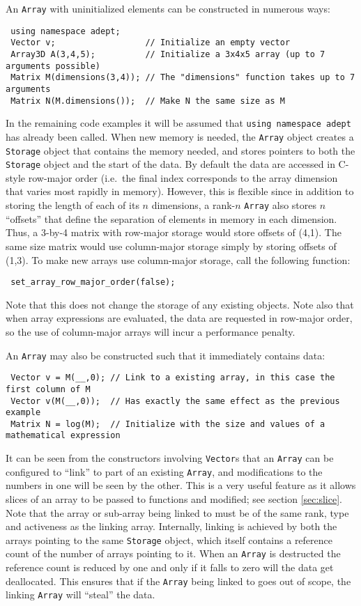 \documentclass[a4,oneside]{book}
\def\codesize{\small}
\def\code#1{{\codesize\texttt{#1}}}
\begin{document}
An \code{Array} with uninitialized elements can be constructed in
numerous ways:
\begin{lstlisting}
 using namespace adept;
 Vector v;                  // Initialize an empty vector
 Array3D A(3,4,5);          // Initialize a 3x4x5 array (up to 7 arguments possible)
 Matrix M(dimensions(3,4)); // The "dimensions" function takes up to 7 arguments
 Matrix N(M.dimensions());  // Make N the same size as M
\end{lstlisting}
In the remaining code examples it will be assumed that
\code{using namespace adept} has already been called.  When new memory
is needed, the \code{Array} object creates a \code{Storage} object
that contains the memory needed, and stores pointers to both the
\code{Storage} object and the start of the data. By default the data
are accessed in C-style row-major order (i.e.\ the final index
corresponds to the array dimension that varies most rapidly in
memory). However, this is flexible since in addition to storing the
length of each of its $n$ dimensions, a rank-$n$ \code{Array} also
stores $n$ ``offsets'' that define the separation of elements in
memory in each dimension. Thus, a 3-by-4 matrix with row-major storage
would store offsets of (4,1). The same size matrix would use
column-major storage simply by storing offsets of (1,3). To make new
arrays use column-major storage, call the following function:
\begin{lstlisting}
 set_array_row_major_order(false);
\end{lstlisting}
Note that this does not change the storage of any existing
objects. Note also that when array expressions are evaluated, the data
are requested in row-major order, so the use of column-major arrays
will incur a performance penalty.

An \code{Array} may also be constructed such that it immediately
contains data:
\begin{lstlisting}
 Vector v = M(__,0); // Link to a existing array, in this case the first column of M
 Vector v(M(__,0));  // Has exactly the same effect as the previous example
 Matrix N = log(M);  // Initialize with the size and values of a mathematical expression
\end{lstlisting}
It can be seen from the constructors involving \code{Vector}s that an
\code{Array} can be configured to ``link'' to part of an existing
\code{Array}, and modifications to the numbers in one will be seen by
the other. This is a very useful feature as it allows slices of an
array to be passed to functions and modified; see section
\ref{sec:slice}. Note that the array or sub-array being linked to must
be of the same rank, type and activeness as the linking array.
Internally, linking is achieved by both the arrays pointing to the
same \code{Storage} object, which itself contains a reference count of
the number of arrays pointing to it. When an \code{Array} is
destructed the reference count is reduced by one and only if it falls
to zero will the data get deallocated. This ensures that if the
\code{Array} being linked to goes out of scope, the linking
\code{Array} will ``steal'' the data.
\end{document}
